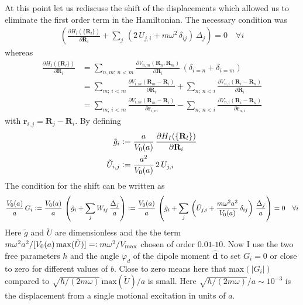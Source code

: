 At this point let us rediscuss the shift of the displacements which allowed us to eliminate the first order term in the Hamiltonian. The necessary condition was
\begin{align*}
    \left(\frac{\partial H_I(\{\mathbf{R}_l\})}{\partial \mathbf{R}_i} +\sum_j\,\left( 2\, U_{j,i} + m\omega^2\,\delta_{ij}\right)\,{\Delta}_j  \right)= 0 \quad\forall i
\end{align*}
whereas
\begin{align*} \frac{\partial H_I(\{\mathbf{R}_l\})}{\partial \mathbf{R}_i} &= \sum_{n,m;\,n<m}\frac{\partial V_{n,m}(\mathbf{R}_n,\mathbf{R}_m)}{\partial \mathbf{R}_i}\,(\delta_{i=n}+\delta_{i=m})\\
&= \sum_{m;\,i<m}\frac{\partial V_{i,m}(\mathbf{R}_m-\mathbf{R}_i)}{\partial \mathbf{R}_i} + \sum_{n;\,n<i}\frac{\partial V_{n,i}(\mathbf{R}_i-\mathbf{R}_n)}{\partial \mathbf{R}_i}\\
&= \sum_{m;\,i<m}\frac{\partial V_{i,m}(\mathbf{R}_m-\mathbf{R}_i)}{\partial \mathbf{r}_{i,m}} - \sum_{n;\,n<i}\frac{\partial V_{n,i}(\mathbf{R}_i-\mathbf{R}_n)}{\partial \mathbf{r}_{n,i}}
\end{align*}
with $\mathbf{r}_{i,j}=\mathbf{R}_j-\mathbf{R}_i$. By defining
\begin{align*}
    \tilde{g}_i&\vcentcolon=\frac{a}{V_0(a)}\,\frac{\partial H_I(\{\mathbf{R}_l\})}{\partial \mathbf{R}_i}\\
    \tilde{U}_{i,j}&\vcentcolon=\frac{a^2}{V_0(a)}\, 2\, U_{j,i} 
\end{align*}
The condition for the shift can be written as
\begin{align*}
     \frac{V_0(a)}{a}\,G_i\vcentcolon=\frac{V_0(a)}{a}\,\left(\tilde{g}_i +\sum_jW_{ij}\,\frac{{\Delta}_j}{a}  \right)\vcentcolon=\frac{V_0(a)}{a}\,\left(\tilde{g}_i +\sum_j\,\left( \tilde{U}_{j,i} + \frac{m\omega^2 a^2}{V_0(a)}\,\delta_{ij}\right)\,\frac{{\Delta}_j}{a}  \right)= 0 \quad\forall i
\end{align*}
Here $\tilde{g}$ and $\tilde{U}$ are dimensionless and the the term $m\omega^2 a^2/[V_0(a)\,\text{max}(\tilde{U})]=\vcentcolon m\omega^2/V_\text{max}$ chosen of order $0.01$-$10$. Now I use the two free parameters $h$ and the angle $\varphi_d$ of the dipole moment $\hat{\mathbf{d}}$ to set $G_i=0$ or close to zero for different values of $b$. Close to zero means here that max$(|G_i|)$ compared to $\sqrt{\hbar/(2m\omega)}\,\text{max}(\tilde{U})/a$ is small. Here $\sqrt{\hbar/(2m\omega)}/a\sim10^{-3}$ is the displacement from a single motional excitation in units of $a$.
